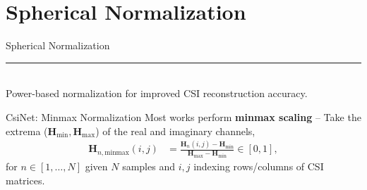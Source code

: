 \documentclass{beamer}
\begin{document}
\section{Spherical Normalization}

  \begin{frame}[plain]
    \vfill
    \centering
    \begin{beamercolorbox}[sep=8pt,center,shadow=true,rounded=true]{Spherical Normalization}
      \insertsectionhead\par%
      \color{davisblue}\noindent\rule{10cm}{1pt} \\
      \footnotesize{Power-based normalization for improved CSI reconstruction accuracy.}
    \end{beamercolorbox}
    \vfill
  \end{frame}

  \begin{frame}{CsiNet: Minmax Normalization}
    Most works perform \textbf{minmax scaling} -- Take the extrema ($\mathbf H_{\text{min}}, \mathbf H_{\text{max}}$) of the real and imaginary channels, 
    \begin{align*}
      \mathbf H_{n,\text{minmax}}(i,j) &= \frac{\mathbf H_n(i,j)-\mathbf H_{\text{min}}}{\mathbf H_{\text{max}}-\mathbf H_{\text{min}}} \in [0,1],
    \end{align*}
    for $n \in [1,\dots,N]$ given $N$ samples and $i,j$ indexing rows/columns of CSI matrices.
  \end{frame}
\end{document}
